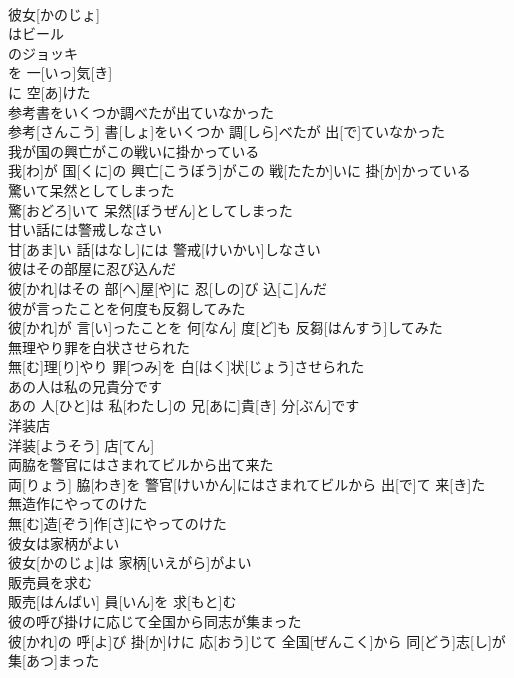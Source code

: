 \documentclass[8pt]{extreport}
\begin{document}
\begin{CJK}{UTF8}{min}
\\	彼女[かのじょ]
\\	はビール 
\\	のジョッキ 
\\	を 一[いっ]気[き]
\\	に 空[あ]けた 
\\	参考書をいくつか調べたが出ていなかった	
\\	参考[さんこう] 書[しょ]をいくつか 調[しら]べたが 出[で]ていなかった
\\	我が国の興亡がこの戦いに掛かっている	
\\	我[わ]が 国[くに]の 興亡[こうぼう]がこの 戦[たたか]いに 掛[か]かっている
\\	驚いて呆然としてしまった	
\\	驚[おどろ]いて 呆然[ぼうぜん]としてしまった
\\	甘い話には警戒しなさい	
\\	甘[あま]い 話[はなし]には 警戒[けいかい]しなさい
\\	彼はその部屋に忍び込んだ	
\\	彼[かれ]はその 部[へ]屋[や]に 忍[しの]び 込[こ]んだ
\\	彼が言ったことを何度も反芻してみた	
\\	彼[かれ]が 言[い]ったことを 何[なん] 度[ど]も 反芻[はんすう]してみた
\\	無理やり罪を白状させられた	
\\	無[む]理[り]やり 罪[つみ]を 白[はく]状[じょう]させられた
\\	あの人は私の兄貴分です	
\\	あの 人[ひと]は 私[わたし]の 兄[あに]貴[き] 分[ぶん]です
\\	洋装店	
\\	洋装[ようそう] 店[てん]
\\	両脇を警官にはさまれてビルから出て来た	
\\	両[りょう] 脇[わき]を 警官[けいかん]にはさまれてビルから 出[で]て 来[き]た
\\	無造作にやってのけた	
\\	無[む]造[ぞう]作[さ]にやってのけた
\\	彼女は家柄がよい	
\\	彼女[かのじょ]は 家柄[いえがら]がよい
\\	販売員を求む	
\\	販売[はんばい] 員[いん]を 求[もと]む
\\	彼の呼び掛けに応じて全国から同志が集まった	
\\	彼[かれ]の 呼[よ]び 掛[か]けに 応[おう]じて 全国[ぜんこく]から 同[どう]志[し]が 集[あつ]まった

\end{CJK}
\end{document}
